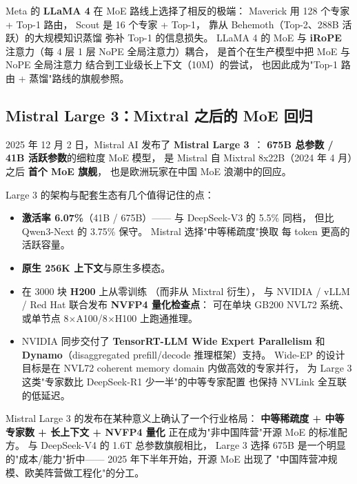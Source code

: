 Meta 的 \textbf{LLaMA 4} 在 MoE 路线上选择了相反的极端：
Maverick 用 128 个专家 + Top-1 路由，
Scout 是 16 个专家 + Top-1，
靠从 Behemoth（Top-2、288B 活跃）的大规模知识蒸馏
弥补 Top-1 的信息损失。
LLaMA 4 的 MoE 与 \textbf{iRoPE} 注意力（每 4 层 1 层 NoPE 全局注意力）耦合，
是首个在生产模型中把 MoE 与 NoPE 全局注意力
结合到工业级长上下文（10M）的尝试，
也因此成为"Top-1 路由 + 蒸馏"路线的旗舰参照。

\subsection{Mistral Large 3：Mixtral 之后的 MoE 回归}
\label{sec:mistral-large3}

2025 年 12 月 2 日，Mistral AI 发布了
\textbf{Mistral Large 3}~\cite{mistralLarge3}：
\textbf{675B 总参数 / 41B 活跃参数}的细粒度 MoE 模型，
是 Mistral 自 Mixtral 8x22B（2024 年 4 月）之后
\textbf{首个 MoE 旗舰}，
也是欧洲玩家在中国 MoE 浪潮中的回应。

Large 3 的架构与配套生态有几个值得记住的点：
\begin{itemize}[noitemsep]
  \item \textbf{激活率 6.07\%}（41B / 675B）——
        与 DeepSeek-V3 的 5.5\% 同档，
        但比 Qwen3-Next 的 3.75\% 保守。
        Mistral 选择"中等稀疏度"换取
        每 token 更高的活跃容量。
  \item \textbf{原生 256K 上下文}与原生多模态。
  \item 在 3000 块 \textbf{H200} 上从零训练
        （而非从 Mixtral 衍生），
        与 NVIDIA / vLLM / Red Hat 联合发布
        \textbf{NVFP4 量化检查点}：
        可在单块 GB200 NVL72 系统、
        或单节点 8$\times$A100/8$\times$H100 上跑通推理。
  \item NVIDIA 同步交付了 \textbf{TensorRT-LLM Wide Expert Parallelism}
        和 \textbf{Dynamo}（disaggregated prefill/decode 推理框架）支持。
        Wide-EP 的设计目标是在 NVL72
        coherent memory domain 内做高效的专家并行，
        为 Large 3 这类"专家数比 DeepSeek-R1 少一半"的中等专家配置
        也保持 NVLink 全互联的低延迟。
\end{itemize}

Mistral Large 3 的发布在某种意义上确认了一个行业格局：
\textbf{中等稀疏度 + 中等专家数 + 长上下文 + NVFP4 量化}
正在成为"非中国阵营"开源 MoE 的标准配方。
与 DeepSeek-V4 的 1.6T 总参数旗舰相比，
Large 3 选择 675B 是一个明显的"成本/能力"折中——
2025 年下半年开始，开源 MoE 出现了
"中国阵营冲规模、欧美阵营做工程化"的分工。

